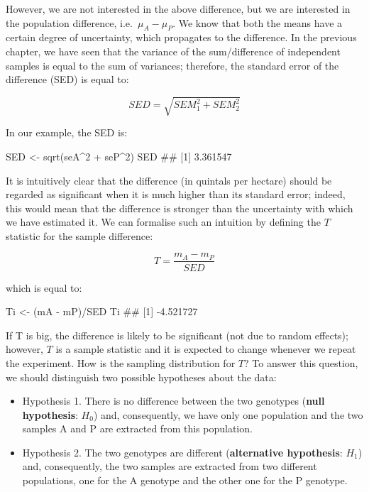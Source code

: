 \documentclass[a4paper,12pt,oneside]{book}
\providecommand{\tightlist}{%
  \setlength{\itemsep}{0pt}\setlength{\parskip}{0pt}}
\newenvironment{Shaded}{\begin{snugshade}}{\end{snugshade}}
\newcommand{\DecValTok}[1]{#1}
\newcommand{\SpecialCharTok}[1]{#1}
\newcommand{\DocumentationTok}[1]{#1}
\newcommand{\OtherTok}[1]{#1}
\newcommand{\FunctionTok}[1]{#1}
\newcommand{\NormalTok}[1]{#1}
\begin{document}
However, we are not interested in the above difference, but we are interested in the population difference, i.e.~\(\mu_A - \mu_P\). We know that both the means have a certain degree of uncertainty, which propagates to the difference. In the previous chapter, we have seen that the variance of the sum/difference of independent samples is equal to the sum of variances; therefore, the standard error of the difference (SED) is equal to:

\[SED = \sqrt{ SEM_1^2 + SEM_2^2 }\]

In our example, the SED is:

\begin{Shaded}
\begin{Highlighting}[]
\NormalTok{SED }\OtherTok{\textless{}{-}} \FunctionTok{sqrt}\NormalTok{(seA}\SpecialCharTok{\^{}}\DecValTok{2} \SpecialCharTok{+}\NormalTok{ seP}\SpecialCharTok{\^{}}\DecValTok{2}\NormalTok{)}
\NormalTok{SED}
\DocumentationTok{\#\# [1] 3.361547}
\end{Highlighting}
\end{Shaded}

It is intuitively clear that the difference (in quintals per hectare) should be regarded as significant when it is much higher than its standard error; indeed, this would mean that the difference is stronger than the uncertainty with which we have estimated it. We can formalise such an intuition by defining the \(T\) statistic for the sample difference:

\[T = \frac{m_A - m_P}{SED}\]

which is equal to:

\begin{Shaded}
\begin{Highlighting}[]
\NormalTok{Ti }\OtherTok{\textless{}{-}}\NormalTok{ (mA }\SpecialCharTok{{-}}\NormalTok{ mP)}\SpecialCharTok{/}\NormalTok{SED}
\NormalTok{Ti}
\DocumentationTok{\#\# [1] {-}4.521727}
\end{Highlighting}
\end{Shaded}

If T is big, the difference is likely to be significant (not due to random effects); however, \(T\) is a sample statistic and it is expected to change whenever we repeat the experiment. How is the sampling distribution for \(T\)? To answer this question, we should distinguish two possible hypotheses about the data:

\begin{itemize}
\tightlist
\item
  Hypothesis 1. There is no difference between the two genotypes (\textbf{null hypothesis}: \(H_0\)) and, consequently, we have only one population and the two samples A and P are extracted from this population.
\item
  Hypothesis 2. The two genotypes are different (\textbf{alternative hypothesis}: \(H_1\)) and, consequently, the two samples are extracted from two different populations, one for the A genotype and the other one for the P genotype.
\end{itemize}
\end{document}
